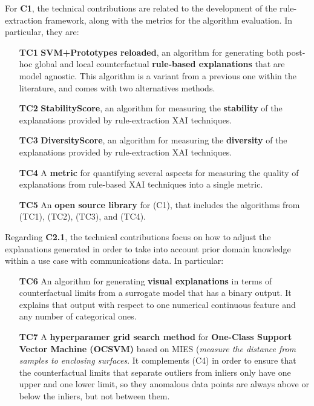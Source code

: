 For \textbf{C1}, the technical contributions are related to the development of the rule-extraction framework, along with the metrics for the algorithm evaluation. In particular, they are:

\begin{itemize}
\item[\textbf{TC1 }] \textbf{SVM+Prototypes reloaded}, an algorithm for generating both post-hoc global and local counterfactual \textbf{rule-based explanations} that are model agnostic. This algorithm is a variant from a previous one within the literature, and comes with two alternatives methods.
\item[\textbf{TC2 }] \textbf{StabilityScore}, an algorithm for measuring the \textbf{stability} of the explanations provided by rule-extraction XAI techniques.
\item[\textbf{TC3 }] \textbf{DiversityScore}, an algorithm for measuring the \textbf{diversity} of the explanations provided by rule-extraction XAI techniques.
\item[\textbf{TC4 }] A \textbf{metric} for quantifying several aspects for measuring the quality of explanations from rule-based XAI techniques into a single metric.
\item[\textbf{TC5 }] An \textbf{open source library} for (C1), that includes the algorithms from (TC1), (TC2), (TC3), and (TC4). 
\end{itemize}

Regarding \textbf{C2.1}, the technical contributions focus on how to adjust the explanations generated in order to take into account prior domain knowledge within a use case with communications data. In particular:
\begin{itemize}
\item[\textbf{TC6 }] An algorithm for generating \textbf{visual explanations} in terms of counterfactual limits from a surrogate model that has a binary output. It explains that output with respect to one numerical continuous feature and any number of categorical ones. 
\item[\textbf{TC7 }] A \textbf{hyperparamer grid search method} for \textbf{One-Class Support Vector Machine (OCSVM)} based on MIES (\textit{measure the distance from samples to enclosing surfaces}. It complements (C4) in order to ensure that the counterfactual limits that separate outliers from inliers only have one upper and one lower limit, so they anomalous data points are always above or below the inliers, but not between them.

\end{itemize}


